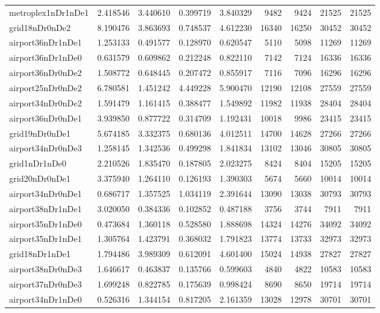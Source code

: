 \begin{longtable}{|l|r|r|r|r|r|r|r|r|}
metroplex1nDr1nDe1 & 2.418546 & 3.440610 & 0.399719 & 3.840329 & 9482 & 9424 & 21525 & 21525 \\
grid18nDr0nDe2 & 8.190476 & 3.863693 & 0.748537 & 4.612230 & 16340 & 16250 & 30452 & 30452 \\
airport36nDr1nDe1 & 1.253133 & 0.491577 & 0.128970 & 0.620547 & 5110 & 5098 & 11269 & 11269 \\
airport36nDr1nDe0 & 0.631579 & 0.609862 & 0.212248 & 0.822110 & 7142 & 7124 & 16336 & 16336 \\
airport36nDr0nDe2 & 1.508772 & 0.648445 & 0.207472 & 0.855917 & 7116 & 7096 & 16296 & 16296 \\
airport25nDr0nDe2 & 6.780581 & 1.451242 & 4.449228 & 5.900470 & 12190 & 12108 & 27559 & 27559 \\
airport34nDr0nDe2 & 1.591479 & 1.161415 & 0.388477 & 1.549892 & 11982 & 11938 & 28404 & 28404 \\
airport36nDr0nDe1 & 3.939850 & 0.877722 & 0.314709 & 1.192431 & 10018 & 9986 & 23415 & 23415 \\
grid19nDr0nDe1 & 5.674185 & 3.332375 & 0.680136 & 4.012511 & 14700 & 14628 & 27266 & 27266 \\
airport34nDr0nDe3 & 1.258145 & 1.342536 & 0.499298 & 1.841834 & 13102 & 13046 & 30805 & 30805 \\
grid1nDr1nDe0 & 2.210526 & 1.835470 & 0.187805 & 2.023275 & 8424 & 8404 & 15205 & 15205 \\
grid20nDr0nDe1 & 3.375940 & 1.264110 & 0.126193 & 1.390303 & 5674 & 5660 & 10014 & 10014 \\
airport34nDr0nDe1 & 0.686717 & 1.357525 & 1.034119 & 2.391644 & 13090 & 13038 & 30793 & 30793 \\
airport38nDr1nDe1 & 3.020050 & 0.384336 & 0.102852 & 0.487188 & 3756 & 3744 & 7911 & 7911 \\
airport35nDr1nDe0 & 0.473684 & 1.360118 & 0.528580 & 1.888698 & 14324 & 14276 & 34092 & 34092 \\
airport35nDr1nDe1 & 1.305764 & 1.423791 & 0.368032 & 1.791823 & 13774 & 13733 & 32973 & 32973 \\
grid18nDr1nDe1 & 1.794486 & 3.989309 & 0.612091 & 4.601400 & 15024 & 14938 & 27827 & 27827 \\
airport38nDr0nDe3 & 1.646617 & 0.463837 & 0.135766 & 0.599603 & 4840 & 4822 & 10583 & 10583 \\
airport37nDr0nDe3 & 1.699248 & 0.822785 & 0.175639 & 0.998424 & 8690 & 8650 & 19714 & 19714 \\
airport34nDr1nDe0 & 0.526316 & 1.344154 & 0.817205 & 2.161359 & 13028 & 12978 & 30701 & 30701 \\

\end{longtable}
